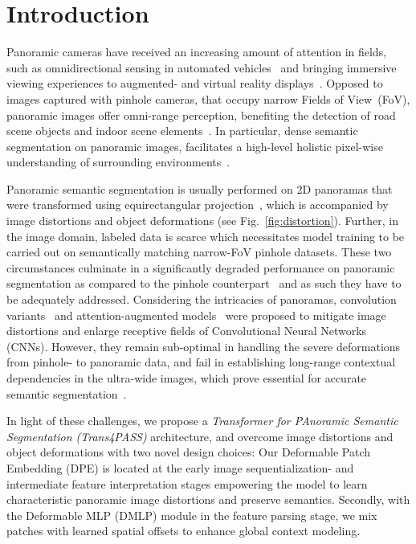 \documentclass[final]{cvpr}
\begin{document}
\section{Introduction}
Panoramic  cameras have received an increasing amount of attention in fields, such as omnidirectional sensing in automated vehicles~\cite{Garanderie_2018_ECCV,omnirange} and bringing immersive viewing experiences to augmented- and virtual reality displays~\cite{xu2018predicting_head_movement,xu2021spherical}.
Opposed to images captured with pinhole cameras, that occupy narrow Fields of View~(FoV), panoramic images offer omni-range perception, benefiting the detection of road scene objects and indoor scene elements~\cite{Garanderie_2018_ECCV,whats_in_my_room}.
In particular, dense semantic segmentation on panoramic images, facilitates a high-level holistic pixel-wise understanding of surrounding environments~\cite{densepass,dspass}.

Panoramic semantic segmentation is usually performed on 2D panoramas that were transformed using equirectangular projection~\cite{hohonet,omnirange}, which is accompanied by image distortions and object deformations (see Fig.~\ref{fig:distortion}).
Further, in the  image domain, labeled data is scarce which necessitates model training to be carried out on semantically matching narrow-FoV pinhole datasets.
These two circumstances culminate in a significantly degraded performance on panoramic segmentation
as compared to the pinhole counterpart~\cite{pass} and as such they have to be adequately addressed.
Considering the intricacies of panoramas, convolution variants~\cite{gauge_equivariant,equivariant_networks,distortion_aware} and attention-augmented models~\cite{omnirange} were proposed to mitigate image distortions and enlarge receptive fields of Convolutional Neural Networks (CNNs). However, they remain sub-optimal in handling the severe deformations from pinhole- to panoramic data, and fail in establishing long-range contextual dependencies in the ultra-wide  images, which prove essential for accurate semantic segmentation~\cite{danet,setr}.

In light of these challenges, we propose a \emph{Transformer for PAnoramic Semantic Segmentation (Trans4PASS)} architecture, and overcome image distortions and object deformations with two novel design choices: Our Deformable Patch Embedding (DPE) is located at the early image sequentialization- and intermediate feature interpretation stages empowering the model to learn characteristic panoramic image distortions and preserve semantics. Secondly, with the Deformable MLP (DMLP) module in the feature parsing stage, we mix patches with learned spatial offsets to enhance global context modeling.
\end{document}
